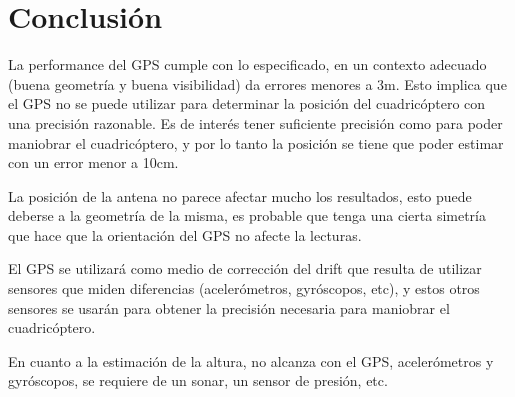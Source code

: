 \documentclass[spanish,12pt,a4paper,titlepage]{report}
\begin{document}

\newpage
\section{Conclusión}
\label{sec:conclusion}

La performance del GPS cumple con lo especificado, en un contexto adecuado (buena geometría y buena visibilidad) da errores menores a 3m. Esto implica que el GPS no se puede utilizar para determinar la posición del cuadricóptero con una precisión razonable. Es de interés tener suficiente precisión como para poder maniobrar el cuadricóptero, y por lo tanto la posición se tiene que poder estimar con un error menor a 10cm.

La posición de la antena no parece afectar mucho los resultados, esto puede deberse a la geometría de la misma, es probable que tenga una cierta simetría que hace que la orientación del GPS no afecte la lecturas.

El GPS se utilizará como medio de corrección del drift que resulta de utilizar sensores que miden diferencias (acelerómetros, gyróscopos, etc), y estos otros sensores se usarán para obtener la precisión necesaria para maniobrar el cuadricóptero.

En cuanto a la estimación de la altura, no alcanza con el GPS, acelerómetros y gyróscopos, se requiere de un sonar, un sensor de presión, etc.
\end{document}
